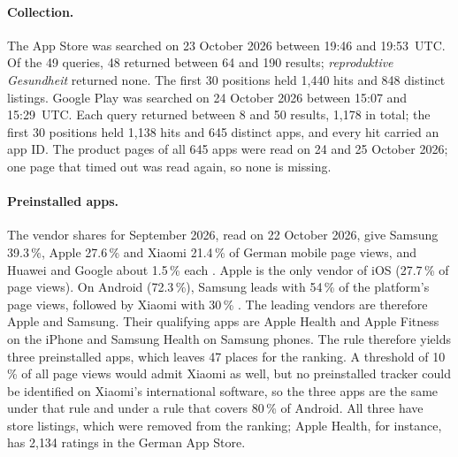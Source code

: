 \documentclass[twoside,its]{bossthesis}
\begin{document}
\paragraph{Collection.} The App Store was searched on 23 October 2026 between
19:46 and 19:53~UTC\@. Of the 49 queries, 48 returned between 64 and 190 results;
\emph{reproduktive Gesundheit} returned none. The first 30 positions held 1{,}440
hits and 848 distinct listings. Google Play was searched on 24 October 2026
between 15:07 and 15:29~UTC\@. Each query returned between 8 and 50 results, 1{,}178
in total; the first 30 positions held 1{,}138 hits and 645 distinct apps, and
every hit carried an app ID\@. The product pages of all 645 apps were read on
24 and 25 October 2026; one page that timed out was read again, so none is
missing.

\paragraph{Preinstalled apps.} The vendor shares for September 2026, read on
22 October 2026, give Samsung 39.3\,\%, Apple 27.6\,\% and Xiaomi 21.4\,\% of
German mobile page views, and Huawei and Google about 1.5\,\% each
\parencite{statcounter2026vendor}. Apple is the only vendor of iOS (27.7\,\% of
page views). On Android (72.3\,\%), Samsung leads with 54\,\% of the
platform's page views, followed by Xiaomi with 30\,\%
\parencite{statcounter2026os}. The leading vendors are therefore Apple and
Samsung. Their qualifying apps are Apple Health and Apple Fitness on the iPhone
and Samsung Health on Samsung phones. The rule therefore yields three
preinstalled apps, which leaves 47 places for the ranking. A threshold of 10\,\%
of all page views would admit Xiaomi as well, but no preinstalled tracker could
be identified on Xiaomi's international software, so the three apps are the same
under that rule and under a rule that covers 80\,\% of Android. All three have store listings, which
were removed from the ranking; Apple Health, for instance, has 2{,}134 ratings
in the German App Store.
\end{document}
